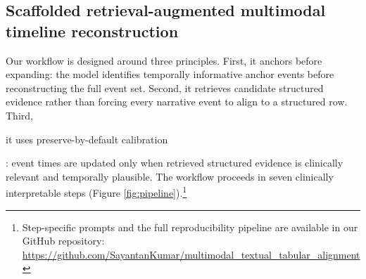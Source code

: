 \documentclass{ws-procs11x85}
\newif\ifshowrebuttalcolor
\newcommand{\rebuttal}[1]{%
  \ifshowrebuttalcolor
    \textcolor{rebuttalblue}{#1}%
  \else
    #1%
  \fi
}
\begin{document}

\vspace{-0.75em}
\subsection{Scaffolded retrieval-augmented multimodal timeline reconstruction}
\label{sec:pipeline}
\vspace{-0.25em}

Our workflow is designed around three principles. First, it anchors before expanding: the model identifies temporally informative anchor events before reconstructing the full event set. Second, it retrieves candidate structured evidence rather than forcing every narrative event to align to a structured row. Third, \rebuttal{it uses preserve-by-default calibration}: event times are updated only when retrieved structured evidence is clinically relevant and temporally plausible. The workflow proceeds in seven clinically interpretable steps (Figure \ref{fig:pipeline}).\footnote{Step-specific prompts and the full reproducibility pipeline are available in our GitHub repository:\\\url{https://github.com/SayantanKumar/multimodal_textual_tabular_alignment}}
\vspace{-5pt}
\end{document}
